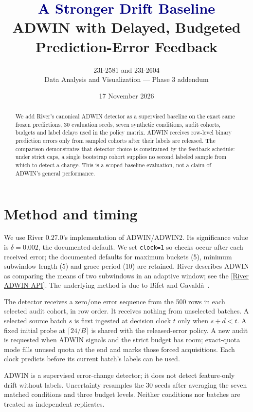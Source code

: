 \documentclass[10pt]{article}
\title{\textcolor{navy}{A Stronger Drift Baseline}\\[3pt]
\large ADWIN with Delayed, Budgeted Prediction-Error Feedback}
\author{23I-2581 and 23I-2604\\Data Analysis and Visualization --- Phase 3 addendum}
\date{17 November 2026}
\begin{document}
\maketitle
\begin{abstract}
We add River's canonical ADWIN detector as a supervised baseline on the exact same frozen predictions, 30 evaluation seeds, seven synthetic conditions, audit cohorts, budgets and label delays used in the policy matrix. ADWIN receives row-level binary prediction errors only from sampled cohorts after their labels are released. The comparison demonstrates that detector choice is constrained by the feedback schedule: under strict caps, a single bootstrap cohort supplies no second labeled sample from which to detect a change. This is a scoped baseline evaluation, not a claim of ADWIN's general performance.
\end{abstract}
\section{Method and timing}
We use River 0.27.0's implementation of ADWIN/ADWIN2. Its significance value is $\delta=0.002$, the documented default. We set \texttt{clock=1} so checks occur after each received error; the documented defaults for maximum buckets (5), minimum subwindow length (5) and grace period (10) are retained. River describes ADWIN as comparing the means of two subwindows in an adaptive window; see the [\href{https://riverml.xyz/latest/api/drift/ADWIN/}{River ADWIN API}]. The underlying method is due to Bifet and Gavald\`a~\cite{bifet2007}.

The detector receives a zero/one error sequence from the 500 rows in each selected audit cohort, in row order. It receives nothing from unselected batches. A selected source batch $s$ is first ingested at decision clock $t$ only when $s+d<t$. A fixed initial probe at $\lceil24/B\rceil$ is shared with the released-error policy. A new audit is requested when ADWIN signals and the strict budget has room; exact-quota mode fills unused quota at the end and marks those forced acquisitions. Each clock predicts before its current batch's labels can be used.

ADWIN is a supervised error-change detector; it does not detect feature-only drift without labels. Uncertainty resamples the 30 seeds after averaging the seven matched conditions and three budget levels. Neither conditions nor batches are treated as independent replicates.
\end{document}
